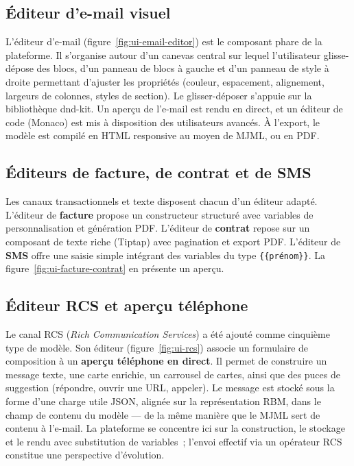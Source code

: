 \subsection{Éditeur d'e-mail visuel}
L'éditeur d'e-mail (figure~\ref{fig:ui-email-editor}) est le composant phare
de la plateforme. Il s'organise autour d'un canevas central sur lequel
l'utilisateur glisse-dépose des blocs, d'un panneau de blocs à gauche et
d'un panneau de style à droite permettant d'ajuster les propriétés (couleur,
espacement, alignement, largeurs de colonnes, styles de section). Le
glisser-déposer s'appuie sur la bibliothèque dnd-kit. Un aperçu de l'e-mail
est rendu en direct, et un éditeur de code (Monaco) est mis à disposition
des utilisateurs avancés. À l'export, le modèle est compilé en HTML
responsive au moyen de MJML, ou en PDF.


\subsection{Éditeurs de facture, de contrat et de SMS}
Les canaux transactionnels et texte disposent chacun d'un éditeur adapté.
L'éditeur de \textbf{facture} propose un constructeur structuré avec
variables de personnalisation et génération PDF. L'éditeur de
\textbf{contrat} repose sur un composant de texte riche (Tiptap) avec
pagination et export PDF. L'éditeur de \textbf{SMS} offre une saisie simple
intégrant des variables du type \texttt{\{\{prénom\}\}}. La
figure~\ref{fig:ui-facture-contrat} en présente un aperçu.


\subsection{Éditeur RCS et aperçu téléphone}
Le canal RCS (\emph{Rich Communication Services}) a été ajouté comme
cinquième type de modèle. Son éditeur (figure~\ref{fig:ui-rcs}) associe un
formulaire de composition à un \textbf{aperçu téléphone en direct}. Il
permet de construire un message texte, une carte enrichie, un carrousel de
cartes, ainsi que des puces de suggestion (répondre, ouvrir une URL,
appeler). Le message est stocké sous la forme d'une charge utile JSON,
alignée sur la représentation RBM, dans le champ de contenu du modèle — de
la même manière que le MJML sert de contenu à l'e-mail. La plateforme se
concentre ici sur la construction, le stockage et le rendu avec substitution
de variables~; l'envoi effectif via un opérateur RCS constitue une
perspective d'évolution.

